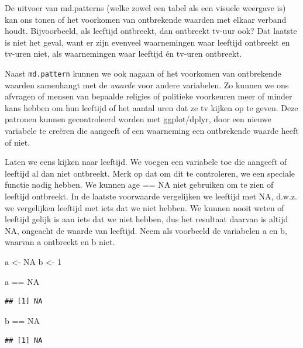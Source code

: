 \documentclass[]{tufte-book}
\newenvironment{Shaded}{}{}
\newcommand{\DecValTok}[1]{\textcolor[rgb]{0.25,0.63,0.44}{#1}}
\newcommand{\NormalTok}[1]{#1}
\newcommand{\OperatorTok}[1]{\textcolor[rgb]{0.40,0.40,0.40}{#1}}
\newcommand{\OtherTok}[1]{\textcolor[rgb]{0.00,0.44,0.13}{#1}}
\newcommand{\StringTok}[1]{\textcolor[rgb]{0.25,0.44,0.63}{#1}}
\begin{document}
De uitvoer van md.patterns (welke zowel een tabel als een visuele weergave is) kan ons tonen of het voorkomen van ontbrekende waarden met elkaar verband houdt. Bijvoorbeeld, als leeftijd ontbreekt, dan ontbreekt tv-uur ook? Dat laatste is niet het geval, want er zijn evenveel waarnemingen waar leeftijd ontbreekt en tv-uren niet, als waarnemingen waar leeftijd én tv-uren ontbreekt.

Naast \texttt{md.pattern} kunnen we ook nagaan of het voorkomen van ontbrekende waarden samenhangt met de \emph{waarde} voor andere variabelen. Zo kunnen we ons afvragen of mensen van bepaalde religies of politieke voorkeuren meer of minder kans hebben om hun leeftijd of het aantal uren dat ze tv kijken op te geven. Deze patronen kunnen gecontroleerd worden met ggplot/dplyr, door een nieuwe variabele te creëren die aangeeft of een waarneming een ontbrekende waarde heeft of niet.

Laten we eens kijken naar leeftijd. We voegen een variabele toe die aangeeft of leeftijd al dan niet ontbreekt. Merk op dat om dit te controleren, we een speciale functie nodig hebben. We kunnen age == NA niet gebruiken om te zien of leeftijd ontbreekt. In de laatste voorwaarde vergelijken we leeftijd met NA, d.w.z. we vergelijken leeftijd met iets dat we niet hebben. We kunnen nooit weten of leeftijd gelijk is aan iets dat we niet hebben, dus het resultaat daarvan is altijd NA, ongeacht de waarde van leeftijd. Neem als voorbeeld de variabelen a en b, waarvan a ontbreekt en b niet.

\begin{Shaded}
\begin{Highlighting}[]
\NormalTok{a <-}\StringTok{ }\OtherTok{NA}
\NormalTok{b <-}\StringTok{ }\DecValTok{1}

\NormalTok{a }\OperatorTok{==}\StringTok{ }\OtherTok{NA}
\end{Highlighting}
\end{Shaded}

\begin{verbatim}
## [1] NA
\end{verbatim}

\begin{Shaded}
\begin{Highlighting}[]
\NormalTok{b }\OperatorTok{==}\StringTok{ }\OtherTok{NA}
\end{Highlighting}
\end{Shaded}

\begin{verbatim}
## [1] NA
\end{verbatim}
\end{document}
